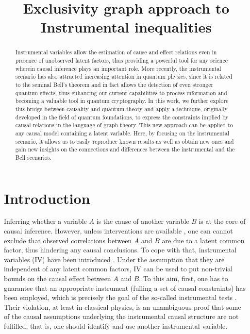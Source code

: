 \documentclass[letterpaper]{article}
\title{Exclusivity graph approach to Instrumental inequalities}
\author{} %
\begin{document}
\maketitle

\begin{abstract}
Instrumental variables allow the estimation of cause and effect relations even
in presence of unobserved latent factors, thus providing a powerful tool for any
science wherein causal inference plays an important role. More recently, the
instrumental scenario has also attracted increasing attention in quantum
physics, since it is related to the seminal Bell's theorem and in fact allows
the detection of even stronger quantum effects, thus enhancing our current
capabilities to process information and becoming a valuable tool in quantum
cryptography. In this work, we further explore this bridge between causality and
quantum theory and apply a technique, originally developed in the field of
quantum foundations, to express the constraints implied by causal relations in
the language of graph theory. This new approach can be applied to any causal
model containing a latent variable. Here, by focusing on the instrumental
scenario, it allows us to easily reproduce known results as well as obtain new
ones and gain new insights on the connections and differences between the
instrumental and the Bell scenarios. 
\end{abstract}

\section*{Introduction}
Inferring  whether a variable $A$ is the cause of another variable $B$ is at the
core of causal inference. However, unless interventions are available
\cite{pearlbook}, one can cannot exclude that observed correlations between $A$ %
and $B$ are due to a latent common factor, thus hindering any causal
conclusions. To cope with that, instrumental variables (IV) have been introduced
\cite{pearl1995, bonet2001}. Under the assumption that they are independent of
any latent common factors, IV can be used to put non-trivial bounds on the
causal effect between $A$ and $B$. To this aim, first, one has to guarantee that
an appropriate instrument (fulling a set of causal constraints) has been
employed, which is precisely the goal of the so-called instrumental tests
\cite{pearl1995, bonet2001}. Their violation, at least in classical physics, is
an unambiguous proof that some of the causal assumptions underlying the
instrumental causal structure are not fulfilled, that is, one should identify
and use another instrumental variable.
\end{document}
